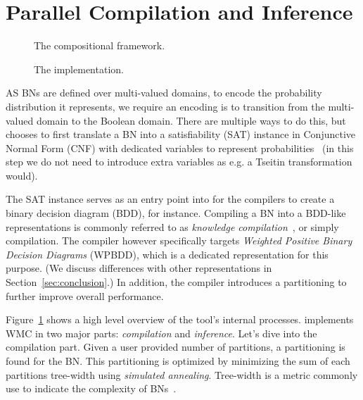 

\section{Parallel Compilation and Inference}
\label{secjjparallel}

\begin{figure}[!t]
    \centering
    \scalebox{0.6}{
        
    }
    \caption{The compositional framework.}
    \label{fig:frameworkoverview}
\end{figure}

\begin{figure}[!t]
    \centering
    
    \caption{The implementation.}
    \label{fig:implementation}
\end{figure}


AS BNs are defined over multi-valued domains, to encode the probability distribution it represents, we require an encoding is to transition from the multi-valued domain to the Boolean domain. There are multiple ways to do this, but \toolname chooses to first translate a BN into a satisfiability (SAT) instance in Conjunctive Normal Form (CNF) with dedicated variables to represent probabilities~\cite{dal2017wpbdd} (in this step we do not need to introduce extra variables as e.g. a Tseitin transformation would).

The SAT instance serves as an entry point into for the compilers to create a binary decision diagram (BDD), for instance. Compiling a BN into a BDD-like representations is commonly referred to as \emph{knowledge compilation}~\cite{darwiche2002knowledge}, or simply compilation. The \toolname compiler however specifically targets \emph{Weighted Positive Binary Decision Diagrams} (WPBDD), which is a dedicated representation for this purpose. (We discuss differences with other representations in Section~\ref{sec:conclusion}.)
	In addition, the compiler introduces a partitioning to further improve overall performance.

Figure~\ref{fig:frameworkoverview} shows a high level overview of the tool's internal processes. \toolname implements WMC in two major parts: \emph{compilation} and \emph{inference}. Let's dive into the compilation part. Given a user provided number of partitions, a partitioning is found for the BN. This partitioning is optimized by minimizing the sum of each partitions tree-width using \emph{simulated annealing}. Tree-width is a metric commonly use to indicate the complexity of BNs~\cite{bollig2014width}.

